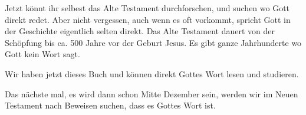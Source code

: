 Jetzt könnt ihr selbest das Alte Testament durchforschen, und suchen wo Gott direkt redet. Aber nicht vergessen, auch wenn es oft vorkommt, spricht Gott in der Geschichte eigentlich selten direkt. Das Alte Testament dauert von der Schöpfung bis ca. 500 Jahre vor der Geburt Jesus. Es gibt ganze Jahrhunderte wo Gott kein Wort sagt.

Wir haben jetzt dieses Buch und können direkt Gottes Wort lesen und studieren.

Das nächste mal, es wird dann schon Mitte Dezember sein, werden wir im Neuen Testament nach Beweisen suchen, dass es Gottes Wort ist.




















